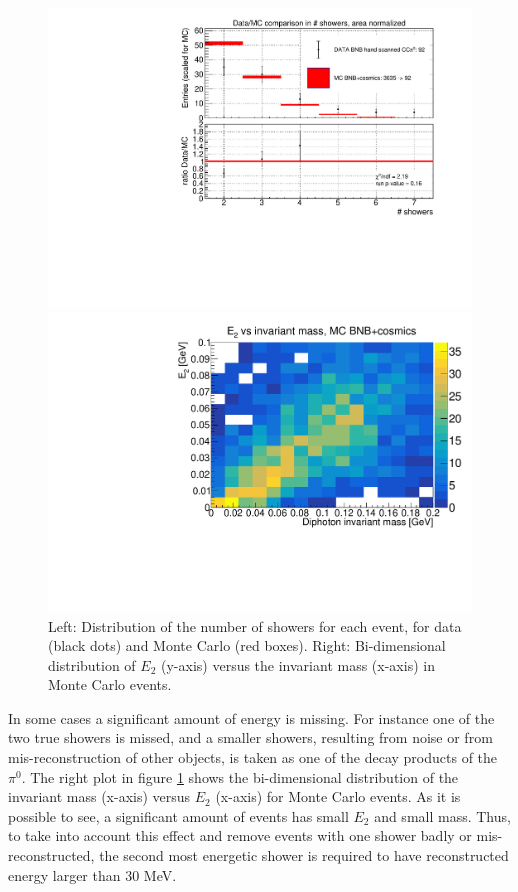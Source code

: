 \documentclass[a4paper]{article}
\begin{document}
\begin{figure}[!htbp]
\centering
\begin{minipage}{0.49\columnwidth}
  \includegraphics[width=0.99\columnwidth]{_fig/n_showers_data_MC_comparison.pdf}
\end{minipage}
\begin{minipage}{0.49\columnwidth} 
  \includegraphics[width=0.99\columnwidth]{_fig/MC_mass_E2.pdf}
\end{minipage}
\caption{Left: Distribution of the number of showers for each event, for data (black dots) and Monte Carlo (red boxes). Right: Bi-dimensional distribution of $E_2$ (y-axis) versus the invariant mass (x-axis) in Monte Carlo events.}
\label{fig:mc_mass_e2}
\end{figure}

In some cases a significant amount of energy is missing. For instance one of the two true showers is missed, and a smaller showers, resulting from noise or from mis-reconstruction of other objects, is taken as one of the decay products of the $\pi^0$. The right plot in figure \ref{fig:mc_mass_e2} shows the bi-dimensional distribution of the invariant mass (x-axis) versus $E_2$ (x-axis) for Monte Carlo events. As it is possible to see, a significant amount of events has small $E_2$ and small mass. Thus, to take into account this effect and remove events with one shower badly or mis-reconstructed, the second most energetic shower is required to have reconstructed energy larger than 30 MeV.
\end{document}

